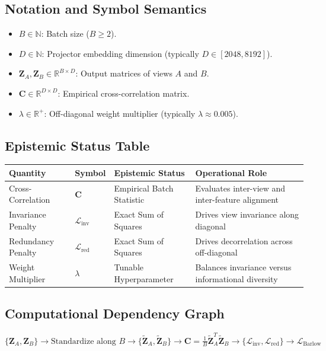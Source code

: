 \documentclass[11pt,a4paper]{article}
\theoremstyle{definition}
\begin{document}
\subsection{Notation and Symbol Semantics}
\begin{itemize}
    \item $B \in \mathbb{N}$: Batch size ($B \ge 2$).
    \item $D \in \mathbb{N}$: Projector embedding dimension (typically $D \in [2048, 8192]$).
    \item $\mathbf{Z}_A, \mathbf{Z}_B \in \mathbb{R}^{B \times D}$: Output matrices of views $A$ and $B$.
    \item $\mathbf{C} \in \mathbb{R}^{D \times D}$: Empirical cross-correlation matrix.
    \item $\lambda \in \mathbb{R}^+$: Off-diagonal weight multiplier (typically $\lambda \approx 0.005$).
\end{itemize}

\subsection{Epistemic Status Table}
\begin{table}[h]
\centering
\small
\begin{tabular}{@{}llll@{}}
\toprule
\textbf{Quantity} & \textbf{Symbol} & \textbf{Epistemic Status} & \textbf{Operational Role} \\
\midrule
Cross-Correlation & $\mathbf{C}$ & Empirical Batch Statistic & Evaluates inter-view and inter-feature alignment \\
Invariance Penalty & $\mathcal{L}_{\text{inv}}$ & Exact Sum of Squares & Drives view invariance along diagonal \\
Redundancy Penalty & $\mathcal{L}_{\text{red}}$ & Exact Sum of Squares & Drives decorrelation across off-diagonal \\
Weight Multiplier & $\lambda$ & Tunable Hyperparameter & Balances invariance versus informational diversity \\
\bottomrule
\end{tabular}
\end{table}

\subsection{Computational Dependency Graph}
{\centering
$\{\mathbf{Z}_A, \mathbf{Z}_B\} \longrightarrow \text{Standardize along } B \longrightarrow \{\tilde{\mathbf{Z}}_A, \tilde{\mathbf{Z}}_B\} \longrightarrow \mathbf{C} = \frac{1}{B}\tilde{\mathbf{Z}}_A^T \tilde{\mathbf{Z}}_B \longrightarrow \{\mathcal{L}_{\text{inv}}, \mathcal{L}_{\text{red}}\} \longrightarrow \mathcal{L}_{\text{Barlow}}$
\par}
\end{document}
